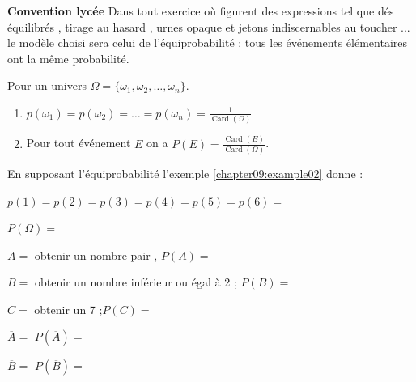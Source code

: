 \documentclass[main.tex]{subfiles}
\begin{document}
 \textbf{Convention lycée} Dans tout exercice où figurent des expressions tel que \og dés équilibrés \fg{}, \og tirage au hasard \fg{}, \og urnes opaque et jetons indiscernables au toucher \fg{}... le modèle choisi sera celui de l’équiprobabilité : tous les événements élémentaires ont la même probabilité.
 \begin{definition} Pour un univers $\Omega=\{ \omega_1, \omega_2, \ldots , \omega_n\}$.
 	\begin{enumerate}[label=\alph*),leftmargin=*] 
 		\item   
 		$
 		p(\omega_1)=p(\omega_2) =\ldots=p(\omega_n)=\frac{1}{\operatorname{Card}(\Omega)}
 		$      
 		\item Pour tout événement $E$ on a $P(E)=\frac{\operatorname{Card}(E)}{\operatorname{Card}(\Omega)}$.
 	\end{enumerate}	 
 \end{definition}
\begin{example} En supposant l'équiprobabilité l'exemple \ref{chapter09:example02} donne :
	
	\hfill $p(1)=p(2)=p(3)=p(4)=p(5)=p(6)=$
	
	\hfill$P(\Omega)=   $
	
	$A=$  \og obtenir un nombre pair \fg{}, \hfill$P(A)=$
	
	$B=$    \og obtenir un nombre inférieur ou égal à 2 \fg{} ; \hfill  $P(B)= $
	
	$C=$ \og obtenir un 7 \fg{} ;\hfill $P(C)=$
	
	$\overline{A}=$ \hfill $P(\overline{A})=$
	
	$\overline{B}=$ \hfill $P(\overline{B})=$
	\end{example} 
\end{document}
